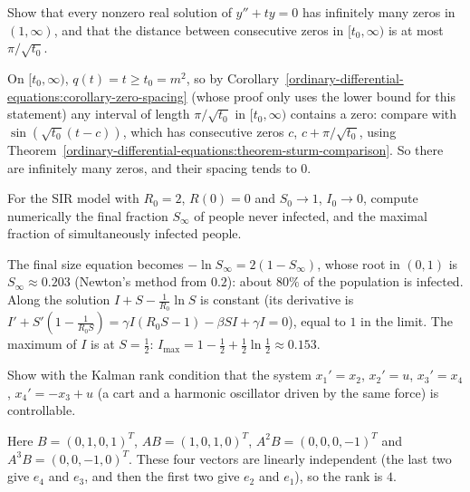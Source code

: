 \begin{exercise}\label{ordinary-differential-equations:exercise-airy-zeros}
Show that every nonzero real solution of $y'' + ty = 0$ has infinitely many zeros in $(1, \infty)$, and that the distance between consecutive zeros in $[t_0, \infty)$ is at most $\pi/\sqrt{t_0}$.
\end{exercise}

\begin{solution}
On $[t_0, \infty)$, $q(t) = t \geq t_0 = m^2$, so by Corollary~\ref{ordinary-differential-equations:corollary-zero-spacing} (whose proof only uses the lower bound for this statement) any interval of length $\pi/\sqrt{t_0}$ in $[t_0, \infty)$ contains a
zero: compare with $\sin(\sqrt{t_0}(t - c))$, which has consecutive zeros $c$, $c + \pi/\sqrt{t_0}$, using Theorem~\ref{ordinary-differential-equations:theorem-sturm-comparison}. So there are infinitely many zeros, and their spacing tends to $0$.
\end{solution}

\begin{exercise}\label{ordinary-differential-equations:exercise-sir-final-size}
For the SIR model with $R_0 = 2$, $R(0) = 0$ and $S_0 \to 1$, $I_0 \to 0$, compute numerically the final fraction $S_\infty$ of people never infected, and the maximal fraction of simultaneously infected people.
\end{exercise}

\begin{solution}
The final size equation becomes $-\ln S_\infty = 2(1 - S_\infty)$, whose root in $(0, 1)$ is $S_\infty \approx 0.203$ (Newton's method from $0.2$): about $80\%$ of the population is infected. Along the solution
$I + S - \frac{1}{R_0}\ln S$ is constant (its derivative is $I' + S'(1 - \frac{1}{R_0S}) = \gamma I(R_0S - 1) - \beta SI + \gamma I = 0$), equal to $1$ in the limit. The maximum of $I$ is at $S = \frac12$: $I_{\max} = 1 - \frac12 + \frac12\ln\frac12 \approx 0.153$.
\end{solution}

\begin{exercise}\label{ordinary-differential-equations:exercise-kalman-two-carts}
Show with the Kalman rank condition that the system $x_1' = x_2$, $x_2' = u$, $x_3' = x_4$, $x_4' = -x_3 + u$ (a cart and a harmonic oscillator driven by the same force) is controllable.
\end{exercise}

\begin{solution}
Here $B = (0, 1, 0, 1)^T$, $AB = (1, 0, 1, 0)^T$, $A^2B = (0, 0, 0, -1)^T$ and $A^3B = (0, 0, -1, 0)^T$. These four vectors are linearly independent (the last two give $e_4$ and $e_3$, and then the first two give $e_2$ and $e_1$), so the rank is $4$.
\end{solution}

